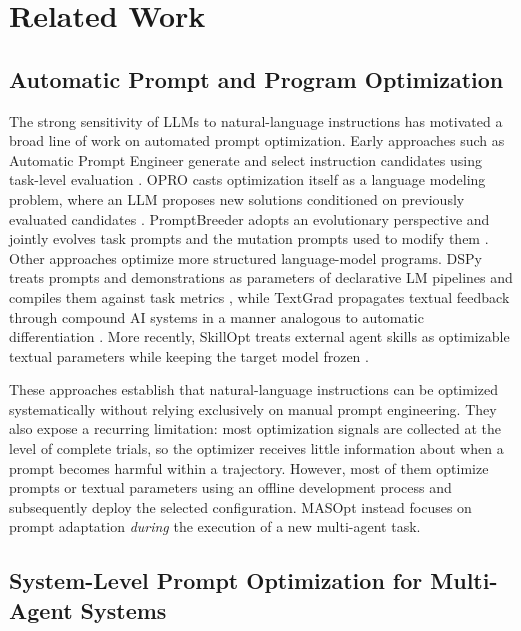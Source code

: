 \section{Related Work}
\label{sec:related_work}

\subsection{Automatic Prompt and Program Optimization}

The strong sensitivity of LLMs to natural-language instructions has motivated a broad line of work on automated prompt optimization.
Early approaches such as Automatic Prompt Engineer generate and select instruction candidates using task-level evaluation
\citep{zhou2022ape,pryzant2023automatic}.
OPRO casts optimization itself as a language modeling problem, where an LLM proposes new solutions conditioned on previously evaluated candidates
\citep{yang2024opro}.
PromptBreeder adopts an evolutionary perspective and jointly evolves task prompts and the mutation prompts used to modify them
\citep{fernando2024promptbreeder}.
Other approaches optimize more structured language-model programs.
DSPy treats prompts and demonstrations as parameters of declarative LM pipelines and compiles them against task metrics
\citep{khattab2024dspy},
while TextGrad propagates textual feedback through compound AI systems in a manner analogous to automatic differentiation
\citep{yuksekgonul2024textgrad,agrawal2025textgrad}.
More recently, SkillOpt treats external agent skills as optimizable textual parameters while keeping the target model frozen
\citep{yang2026skillopt}.

These approaches establish that natural-language instructions can be optimized systematically without relying exclusively on manual prompt engineering. They also expose a recurring limitation: most optimization signals are collected at the level of complete trials, so the optimizer receives little information about when a prompt becomes harmful within a trajectory.
However, most of them optimize prompts or textual parameters using an offline development process and subsequently deploy the selected configuration.
MASOpt instead focuses on prompt adaptation \emph{during} the execution of a new multi-agent task.


\subsection{System-Level Prompt Optimization for Multi-Agent Systems}

